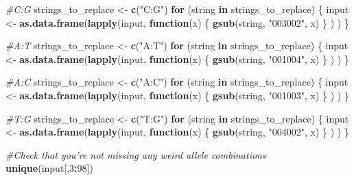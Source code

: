 \documentclass[
]{article}
\newenvironment{Shaded}{\begin{snugshade}}{\end{snugshade}}
\newcommand{\CommentTok}[1]{\textcolor[rgb]{0.56,0.35,0.01}{\textit{#1}}}
\newcommand{\ControlFlowTok}[1]{\textcolor[rgb]{0.13,0.29,0.53}{\textbf{#1}}}
\newcommand{\DecValTok}[1]{\textcolor[rgb]{0.00,0.00,0.81}{#1}}
\newcommand{\KeywordTok}[1]{\textcolor[rgb]{0.13,0.29,0.53}{\textbf{#1}}}
\newcommand{\NormalTok}[1]{#1}
\newcommand{\OperatorTok}[1]{\textcolor[rgb]{0.81,0.36,0.00}{\textbf{#1}}}
\newcommand{\StringTok}[1]{\textcolor[rgb]{0.31,0.60,0.02}{#1}}
\begin{document}
\begin{Shaded}
\begin{Highlighting}[]
\CommentTok{#C:G}
\NormalTok{strings_to_replace <-}\StringTok{ }\KeywordTok{c}\NormalTok{(}\StringTok{"C:G"}\NormalTok{)}
\ControlFlowTok{for}\NormalTok{ (string }\ControlFlowTok{in}\NormalTok{ strings_to_replace) \{ }
\NormalTok{  input <-}\StringTok{ }\KeywordTok{as.data.frame}\NormalTok{(}\KeywordTok{lapply}\NormalTok{(input, }\ControlFlowTok{function}\NormalTok{(x) \{ }
                                \KeywordTok{gsub}\NormalTok{(string, }\StringTok{"003002"}\NormalTok{, x)}
\NormalTok{                                \}}
\NormalTok{                              )}
\NormalTok{                        )}
\NormalTok{  \} }
  
\CommentTok{#A:T}
\NormalTok{strings_to_replace <-}\StringTok{ }\KeywordTok{c}\NormalTok{(}\StringTok{"A:T"}\NormalTok{)}
\ControlFlowTok{for}\NormalTok{ (string }\ControlFlowTok{in}\NormalTok{ strings_to_replace) \{ }
\NormalTok{  input <-}\StringTok{ }\KeywordTok{as.data.frame}\NormalTok{(}\KeywordTok{lapply}\NormalTok{(input, }\ControlFlowTok{function}\NormalTok{(x) \{ }
                                \KeywordTok{gsub}\NormalTok{(string, }\StringTok{"001004"}\NormalTok{, x)}
\NormalTok{                                \}}
\NormalTok{                              )}
\NormalTok{                        )}
\NormalTok{  \} }

\CommentTok{#A:C}
\NormalTok{strings_to_replace <-}\StringTok{ }\KeywordTok{c}\NormalTok{(}\StringTok{"A:C"}\NormalTok{)}
\ControlFlowTok{for}\NormalTok{ (string }\ControlFlowTok{in}\NormalTok{ strings_to_replace) \{ }
\NormalTok{  input <-}\StringTok{ }\KeywordTok{as.data.frame}\NormalTok{(}\KeywordTok{lapply}\NormalTok{(input, }\ControlFlowTok{function}\NormalTok{(x) \{ }
                                \KeywordTok{gsub}\NormalTok{(string, }\StringTok{"001003"}\NormalTok{, x)}
\NormalTok{                                \}}
\NormalTok{                              )}
\NormalTok{                        )}
\NormalTok{  \} }
  
\CommentTok{#T:G}
\NormalTok{strings_to_replace <-}\StringTok{ }\KeywordTok{c}\NormalTok{(}\StringTok{"T:G"}\NormalTok{)}
\ControlFlowTok{for}\NormalTok{ (string }\ControlFlowTok{in}\NormalTok{ strings_to_replace) \{ }
\NormalTok{  input <-}\StringTok{ }\KeywordTok{as.data.frame}\NormalTok{(}\KeywordTok{lapply}\NormalTok{(input, }\ControlFlowTok{function}\NormalTok{(x) \{ }
                                \KeywordTok{gsub}\NormalTok{(string, }\StringTok{"004002"}\NormalTok{, x)}
\NormalTok{                                \}}
\NormalTok{                              )}
\NormalTok{                        )}
\NormalTok{  \} }

\CommentTok{#Check that you're not missing any weird allele combinations}
\KeywordTok{unique}\NormalTok{(input[,}\DecValTok{3}\OperatorTok{:}\DecValTok{98}\NormalTok{])}
\end{Highlighting}
\end{Shaded}
\end{document}
